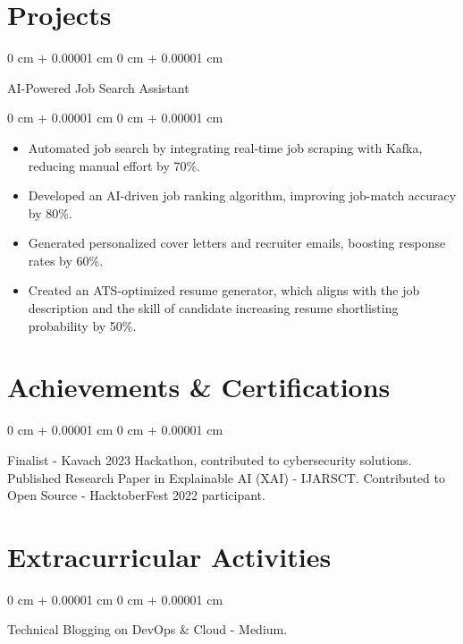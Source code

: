 \documentclass[10pt, letterpaper]{article}
\newenvironment{highlights}{
    \begin{itemize}[
        topsep=0.10 cm,
        parsep=0.10 cm,
        partopsep=0pt,
        itemsep=0pt,
        leftmargin=0 cm + 10pt
    ]
}{
    \end{itemize}
} %
\newenvironment{onecolentry}{
    \begin{adjustwidth}{
        0 cm + 0.00001 cm
    }{
        0 cm + 0.00001 cm
    }
}{
    \end{adjustwidth}
} %
\newenvironment{twocolentry}[2][]{
    \onecolentry
    \def\secondColumn{#2}
    \setcolumnwidth{\fill, 4.5 cm}
    \begin{paracol}{2}
}{
    \switchcolumn \raggedleft \secondColumn
    \end{paracol}
    \endonecolentry
} %
\begin{document}
    \section{Projects}

        \begin{twocolentry}{
            AI-Powered Job Search Assistant
        }

        \end{twocolentry}

        \vspace{0.10 cm}
        \begin{onecolentry}
            \begin{highlights}
                \item Automated job search by integrating real-time job scraping with Kafka, reducing manual effort by 70\%.
                \item Developed an AI-driven job ranking algorithm, improving job-match accuracy by 80\%.
                \item Generated personalized cover letters and recruiter emails, boosting response rates by 60\%.
                \item Created an ATS-optimized resume generator, which aligns with the job description and the skill of candidate increasing resume shortlisting probability by 50\%.
            \end{highlights}
        \end{onecolentry}

    \section{Achievements \& Certifications}

        \begin{onecolentry}
            Finalist - Kavach 2023 Hackathon, contributed to cybersecurity solutions. Published Research Paper in Explainable AI (XAI) - IJARSCT. Contributed to Open Source - HacktoberFest 2022 participant.
        \end{onecolentry}

    \section{Extracurricular Activities}

        \begin{onecolentry}
            Technical Blogging on DevOps \& Cloud - Medium.
        \end{onecolentry}
\end{document}
